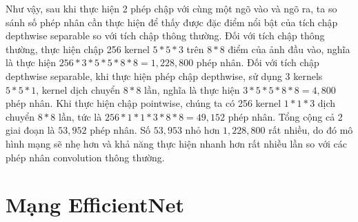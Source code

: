 Như vậy, sau khi thực hiện 2 phép chập với cùng một ngõ vào và ngõ ra, ta so sánh số phép nhân cần thực hiện để thấy được đặc điểm nổi bật của tích chập depthwise separable so với tích chập thông thường. Đối với tích chập thông thường, thực hiện chập 256 kernel $5*5*3$ trên $8*8$ điểm của ảnh đầu vào, nghĩa là thực hiện $256*3*5*5*8*8 = 1,228,800$ phép nhân. Đối với tích chập depthwise separable, khi thực hiện phép chập depthwise, sử dụng 3 kernels $5*5*1$, kernel dịch chuyển $8*8$ lần, nghĩa là thực hiện $3*5*5*8*8 = 4,800$ phép nhân. Khi thực hiện chập pointwise, chúng ta có 256 kernel $1*1*3$ dịch chuyển $8*8$ lần, tức là $256*1*1*3*8*8= 49,152$ phép nhân. Tổng cộng cả 2 giai đoạn là $53,952$ phép nhân. Số $53,953$ nhỏ hơn $1,228,800$ rất nhiều, do đó mô hình mạng sẽ nhẹ hơn và khả năng thực hiện nhanh hơn rất nhiều lần so với các phép nhân convolution thông thường.

\section{Mạng EfficientNet}
